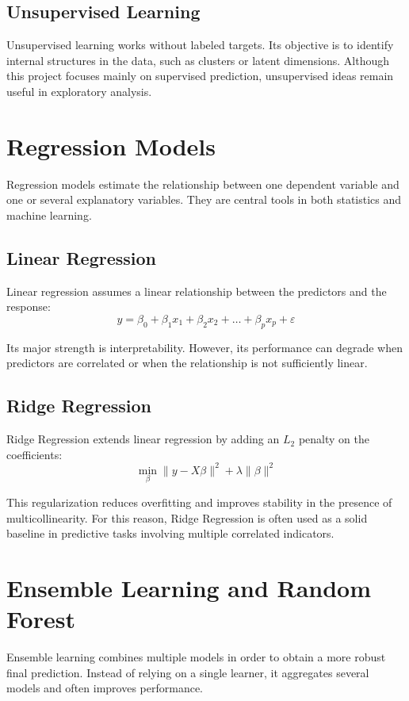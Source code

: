 \subsection{Unsupervised Learning}

Unsupervised learning works without labeled targets.
Its objective is to identify internal structures in the data, such as clusters or latent dimensions.
Although this project focuses mainly on supervised prediction, unsupervised ideas remain useful in exploratory analysis.

\section{Regression Models}

Regression models estimate the relationship between one dependent variable and one or several explanatory variables.
They are central tools in both statistics and machine learning.

\subsection{Linear Regression}

Linear regression assumes a linear relationship between the predictors and the response:
\[
y = \beta_0 + \beta_1x_1 + \beta_2x_2 + \dots + \beta_px_p + \varepsilon
\]

Its major strength is interpretability.
However, its performance can degrade when predictors are correlated or when the relationship is not sufficiently linear.

\subsection{Ridge Regression}

Ridge Regression extends linear regression by adding an \(L_2\) penalty on the coefficients:
\[
\min_{\beta} \|y - X\beta\|^2 + \lambda \|\beta\|^2
\]

This regularization reduces overfitting and improves stability in the presence of multicollinearity.
For this reason, Ridge Regression is often used as a solid baseline in predictive tasks involving multiple correlated indicators.

\section{Ensemble Learning and Random Forest}

Ensemble learning combines multiple models in order to obtain a more robust final prediction.
Instead of relying on a single learner, it aggregates several models and often improves performance.

